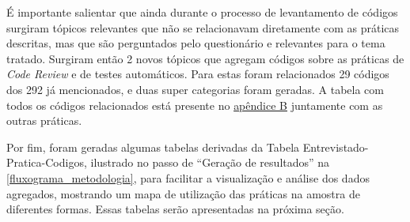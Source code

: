 É importante salientar que ainda durante o processo de levantamento de códigos surgiram tópicos relevantes que não se relacionavam diretamente com as práticas descritas, mas que são perguntados pelo questionário e relevantes para o tema tratado. Surgiram então 2 novos tópicos que agregam códigos sobre as práticas de \emph{Code Review} e de testes automáticos. Para estas foram relacionados 29 códigos dos 292 já mencionados, e duas super categorias foram geradas. A tabela com todos os códigos relacionados está presente no \hyperlink{tabela1}{apêndice B} juntamente com as outras práticas.

Por fim, foram geradas algumas tabelas derivadas da Tabela Entrevistado-Pratica-Codigos, ilustrado no passo de ``Geração de resultados'' na \ref{fluxograma_metodologia}, para facilitar a visualização e análise dos dados agregados, mostrando um mapa de utilização das práticas na amostra de diferentes formas. Essas tabelas serão apresentadas na próxima seção.
